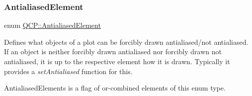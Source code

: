 \subsubsection{\texorpdfstring{Antialiased\+Element}{AntialiasedElement}}
{\footnotesize\ttfamily enum \mbox{\hyperlink{namespace_q_c_p_ae55dbe315d41fe80f29ba88100843a0c}{Q\+C\+P\+::\+Antialiased\+Element}}}

Defines what objects of a plot can be forcibly drawn antialiased/not antialiased. If an object is neither forcibly drawn antialiased nor forcibly drawn not antialiased, it is up to the respective element how it is drawn. Typically it provides a {\itshape set\+Antialiased} function for this.

{\ttfamily Antialiased\+Elements} is a flag of or-\/combined elements of this enum type.

